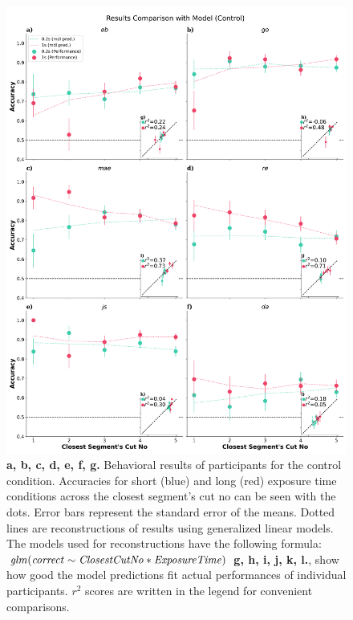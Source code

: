\documentclass{article}
\begin{document}
\begin{figure}    
    \vspace{-1cm}
    \includegraphics[width=\textwidth]{plots/cntrl_all.png}    
    \caption{\textbf{a, b, c, d, e, f, g.} Behavioral results of participants for the control condition. Accuracies for short (blue) and long (red) exposure time conditions across the closest segment's cut no can be seen with the dots. Error bars represent the standard error of the means. Dotted lines are reconstructions of results using generalized linear models. The models used for reconstructions have the following formula: $\it{glm(correct \sim Closest Cut No * Exposure Time)}$ \textbf{g, h, i, j, k, l.}, show how good the model predictions fit actual performances of individual participants. $r^2$ scores are written in the legend for convenient comparisons. }
    \label{fig:behav_control}
\end{figure}
\end{document}
